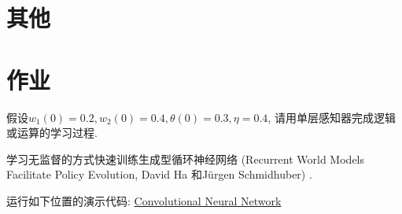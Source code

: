 \section{其他}

\section{作业}
\begin{think}
    假设$w_1 (0)=0.2, w_2 (0)=0.4, \theta (0)=0.3, \eta=0.4$, 请用单层感知器完成逻辑或运算的学习过程.
\end{think}

\begin{think}
    学习无监督的方式快速训练生成型循环神经网络 (Recurrent World Models Facilitate Policy Evolution, David Ha 和Jürgen Schmidhuber) \cite{ha2018worldmodels}.
\end{think}

\begin{think}
    运行如下位置的演示代码: \href{https://colab.research.google.com/drive/16a3G7Hh8Pv1X1PhZAUBEnZEkXThzDeHJ#scrollTo=D_a2USyd4giE}{Convolutional Neural Network}
\end{think}
